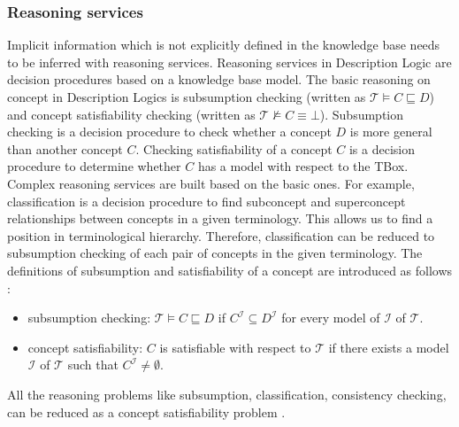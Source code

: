 \documentclass{article}
\begin{document}
\subsubsection{Reasoning services}
Implicit information which is not explicitly defined in the knowledge base needs to be inferred with reasoning services.
Reasoning services in Description Logic are decision procedures based on a knowledge base model. 
The basic reasoning on concept in Description Logics is subsumption checking (written as $\mathcal{T}\vDash C\sqsubseteq D$) and 
concept satisfiability checking (written as $\mathcal{T}\nvDash C\equiv \bot$).
Subsumption checking is a decision procedure to check whether a concept $D$ is more general than another concept $C$.
Checking satisfiability of a concept $C$ is a decision procedure to determine whether $C$ has a model with respect to the TBox.
Complex reasoning services are built based on the basic ones. For example, classification is a decision procedure  to find subconcept and superconcept 
relationships between concepts in a given terminology. This allows us to find a position in terminological hierarchy.
Therefore, classification can be reduced to subsumption checking of each pair of concepts in the given terminology.
The definitions of subsumption and satisfiability of a concept are introduced as follows \cite{baader2003description}:
\begin{itemize}
\item subsumption checking: $\mathcal{T}\vDash C\sqsubseteq D$ if $C^\mathcal{I}\subseteq D^\mathcal{I}$ for every model of $\mathcal{I}$ of $\mathcal{T}$.
\item concept satisfiability: $C$ is satisfiable with respect to $\mathcal{T}$ if there exists a model $\mathcal{I}$ of $\mathcal{T}$ such that $C^\mathcal{I}\neq \emptyset$.
\end{itemize}
All the reasoning problems like subsumption, classification, consistency checking, can be reduced as a concept satisfiability problem \cite{baader2003description}.
\end{document}
